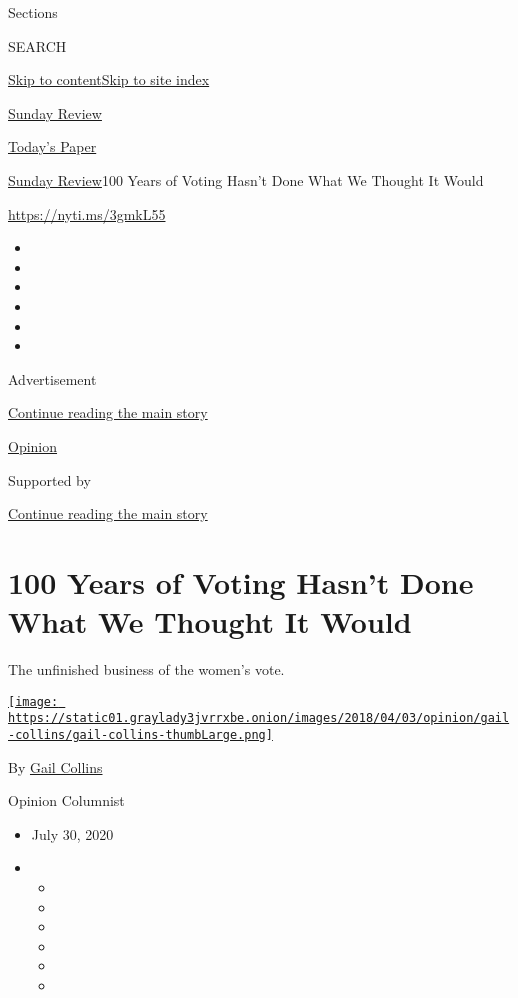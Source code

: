 Sections

SEARCH

\protect\hyperlink{site-content}{Skip to
content}\protect\hyperlink{site-index}{Skip to site index}

\href{https://www.nytimes3xbfgragh.onion/section/opinion/sunday}{Sunday
Review}

\href{https://myaccount.nytimes3xbfgragh.onion/auth/login?response_type=cookie\&client_id=vi}{}

\href{https://www.nytimes3xbfgragh.onion/section/todayspaper}{Today's
Paper}

\href{/section/opinion/sunday}{Sunday Review}\textbar{}100 Years of
Voting Hasn't Done What We Thought It Would

\href{https://nyti.ms/3gmkL55}{https://nyti.ms/3gmkL55}

\begin{itemize}
\item
\item
\item
\item
\item
\item
\end{itemize}

Advertisement

\protect\hyperlink{after-top}{Continue reading the main story}

\href{/section/opinion}{Opinion}

Supported by

\protect\hyperlink{after-sponsor}{Continue reading the main story}

\hypertarget{100-years-of-voting-hasnt-done-what-we-thought-it-would}{%
\section{100 Years of Voting Hasn't Done What We Thought It
Would}\label{100-years-of-voting-hasnt-done-what-we-thought-it-would}}

The unfinished business of the women's vote.

\href{https://www.nytimes3xbfgragh.onion/by/gail-collins}{\texttt{[image: https://static01.graylady3jvrrxbe.onion/images/2018/04/03/opinion/gail-collins/gail-collins-thumbLarge.png]}}

By \href{https://www.nytimes3xbfgragh.onion/by/gail-collins}{Gail
Collins}

Opinion Columnist

\begin{itemize}
\item
  July 30, 2020
\item
  \begin{itemize}
  \item
  \item
  \item
  \item
  \item
  \item
  \end{itemize}
\end{itemize}

